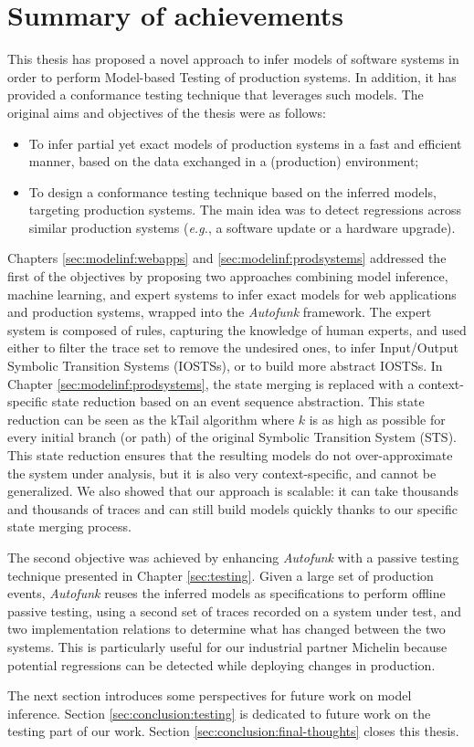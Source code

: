 \section{Summary of achievements}

This thesis has proposed a novel approach to infer models
of software systems in order to perform Model-based Testing of
production systems. In addition, it has provided a conformance
testing technique that leverages such models. The original aims
and objectives of the thesis were as follows:

\begin{itemize}
    \item To infer partial yet exact models of production systems
        in a fast and efficient manner, based on the data
        exchanged in a (production) environment;

    \item To design a conformance testing technique based on the
        inferred models, targeting production systems. The main
        idea was to detect regressions across similar production
        systems (\emph{e.g.}, a software update or a hardware
        upgrade).
\end{itemize}

Chapters \ref{sec:modelinf:webapps} and
\ref{sec:modelinf:prodsystems} addressed the first of the
objectives by proposing two approaches combining model inference,
machine learning, and expert systems to infer exact models for
web applications and production systems, wrapped into the
\textit{Autofunk} framework.  The expert system is composed of
rules, capturing the knowledge of human experts, and used either
to filter the trace set to remove the undesired ones, to infer
Input/Output Symbolic Transition Systems (IOSTSs), or to build
more abstract IOSTSs. In Chapter \ref{sec:modelinf:prodsystems},
the state merging is replaced with a context-specific state
reduction based on an event sequence abstraction. This state
reduction can be seen as the kTail algorithm \cite{5009015} where
$k$ is as high as possible for every initial branch (or path) of
the original Symbolic Transition System (STS). This state
reduction ensures that the resulting models do not
over-approximate the system under analysis, but it is also very
context-specific, and cannot be generalized. We also showed that
our approach is scalable: it can take thousands and thousands of
traces and can still build models quickly thanks to our specific
state merging process.

The second objective was achieved by enhancing \textit{Autofunk}
with a passive testing technique presented in Chapter
\ref{sec:testing}. Given a large set of production events,
\textit{Autofunk} reuses the inferred models as specifications to
perform offline passive testing, using a second set of traces
recorded on a system under test, and two implementation relations
to determine what has changed between the two systems. This is
particularly useful for our industrial partner Michelin because
potential regressions can be detected while deploying changes in
production.

The next section introduces some perspectives for future work on
model inference. Section \ref{sec:conclusion:testing} is
dedicated to future work on the testing part of our work. Section
\ref{sec:conclusion:final-thoughts} closes this thesis.
